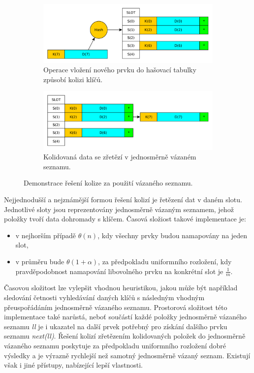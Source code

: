 \begin{figure}
	\centering
	\begin{subfigure}[b]{0.49\textwidth}
		\includegraphics[width=\textwidth]{fig/chained_hashing_insert}
		\caption{Operace vložení nového prvku do hašovací tabulky způsobí kolizi klíčů.}
	\end{subfigure}
	\begin{subfigure}[b]{0.49\textwidth}
		\includegraphics[width=\textwidth]{fig/chained_hashing_insert_result}
		\caption{Kolidovaná data se zřetězí v jednosměrně vázaném seznamu.}
	\end{subfigure}
	\caption{Demonstrace řešení kolize za použití vázaného seznamu.}
	\label{chained_hashing}
\end{figure}

Nejjednodušší a nejznámější formou řešení kolizí je řetězení dat v daném slotu. Jednotlivé 
sloty jsou reprezentovány jednosměrně vázaným seznamem, jehož položky tvoří data dohromady
s klíčem. Časová složiost takové implementace je:
\begin{itemize}
	\item v nejhorším případě $\theta (n)$, kdy všechny prvky budou namapovány
	na jeden slot,
	\item v průměru bude $\theta (1 + \alpha)$, za předpokladu
	uniformního rozložení, kdy pravděpodobnost namapování libovolného
	prvku na konkrétní slot je $\frac{1}{m}$.
\end{itemize}

Časovou složitost lze vylepšit vhodnou heuristikou, jakou může být například sledování
četnosti vyhledávání daných klíčů s následným vhodným přeuspořádáním jednosměrně vázaného
seznamu. Prostorová složitost této implementace také narůstá, neboť součástí každé položky jednosměrně
vázaného seznamu \textit{ll} je i ukazatel na další prvek potřebný pro získání
dalšího prvku seznamu \textit{next(ll)}. Řešení kolizí zřetězením kolidovaných 
položek do jednosměrně vázaného seznamu poskytuje za předpokladu uniformního rozložení dobré
výsledky a je výrazně rychlejší než samotný jednosměrně vázaný seznam. Existují však i jiné
přístupy, nabízející lepší vlastnosti.


